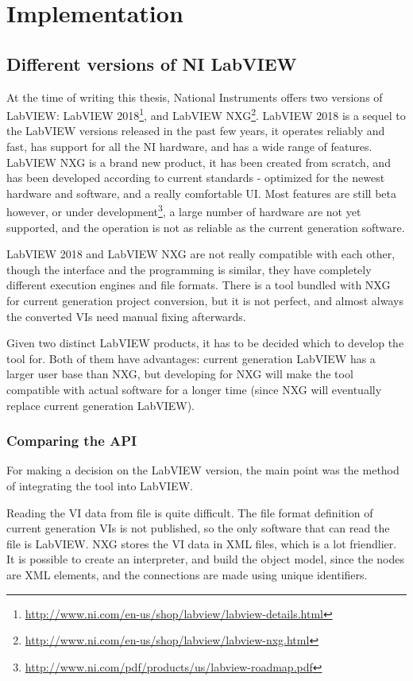 \chapter{Implementation}
\section{Different versions of NI LabVIEW}
At the time of writing this thesis, National Instruments offers two versions of LabVIEW: LabVIEW 2018\footnote{\url{http://www.ni.com/en-us/shop/labview/labview-details.html}}, and LabVIEW NXG\footnote{\url{http://www.ni.com/en-us/shop/labview/labview-nxg.html}}. LabVIEW 2018 is a sequel to the LabVIEW versions released in the past few years, it operates reliably and fast, has support for all the NI hardware, and has a wide range of features. LabVIEW NXG is a brand new product, it has been created from scratch, and has been developed according to current standards - optimized for the newest hardware and software, and a really comfortable UI. Most features are still beta however, or under development\footnote{\url{http://www.ni.com/pdf/products/us/labview-roadmap.pdf}}, a large number of hardware are not yet supported, and the operation is not as reliable as the current generation software.\cite{nxg_article}

LabVIEW 2018 and LabVIEW NXG are not really compatible with each other, though the interface and the programming is similar, they have completely different execution engines and file formats. There is a tool bundled with NXG for current generation project conversion, but it is not perfect, and almost always the converted VIs need manual fixing afterwards.

Given two distinct LabVIEW products, it has to be decided which to develop the tool for. Both of them have advantages: current generation LabVIEW has a larger user base than NXG, but developing for NXG will make the tool compatible with actual software for a longer time (since NXG will eventually replace current generation LabVIEW).
\subsection{Comparing the API}
For making a decision on the LabVIEW version, the main point was the method of integrating the tool into LabVIEW. 

Reading the VI data from file is quite difficult. The file format definition of current generation VIs is not published, so the only software that can read the file is LabVIEW. NXG stores the VI data in XML files, which is a lot friendlier. It is possible to create an interpreter, and build the object model, since the nodes are XML elements, and the connections are made using unique identifiers.

